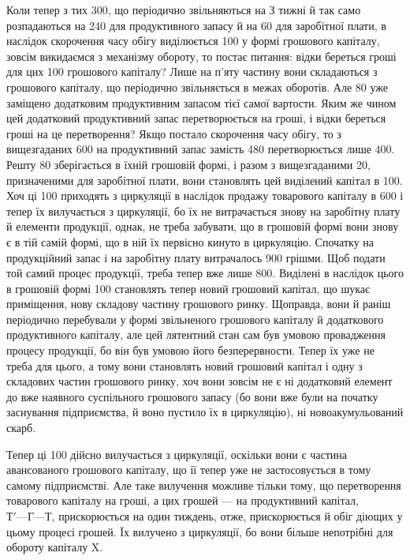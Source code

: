 Коли тепер з тих 300, що періодично звільняються на З
тижні й так само розпадаються на 240 для продуктивного запасу
й на 60 для заробітної плати, в наслідок скорочення часу
обігу виділюється 100 у формі грошового капіталу, зовсім викидаємся
з механізму обороту, то постає питання: відки береться гроші
для цих 100 грошового капіталу? Лише на п’яту частину вони
складаються з грошового капіталу, що періодично звільняється в межах
оборотів. Але  \deq{} 80 уже заміщено додатковим продуктивним
запасом тієї самої вартости. Яким же чином цей додатковий продуктивний
запас перетворюється на гроші, і відки береться гроші на це перетворення?
Якщо постало скорочення часу обігу, то з вищезгаданих 600
на продуктивний запас замість 480 перетворюється лише 400. Решту 80 зберігається в їхній грошовій формі, і
разом з вищезгаданими 20, призначеними для заробітної плати,
вони становлять цей виділений капітал в 100. Хоч ці 100 приходять з циркуляції в наслідок продажу товарового капіталу в
600 і тепер їх вилучається з циркуляції, бо їх не витрачається
знову на заробітну плату й елементи продукції, однак, не треба забувати,
що в грошовій формі вони знову є в тій самій формі, що в ній їх
первісно кинуто в циркуляцію. Спочатку на продукційний запас і на заробітну
плату витрачалось 900 грішми. Щоб подати той
самий процес продукції, треба тепер вже лише 800. Виділені в
наслідок цього в грошовій формі 100 становлять тепер новий
грошовий капітал, що шукає приміщення, нову складову частину грошового
ринку. Щоправда, вони й раніш періодично перебували у формі
звільненого грошового капіталу й додаткового продуктивного капіталу,
але цей лятентний стан сам був умовою провадження процесу продукції,
бо він був умовою його безперервности. Тепер їх уже не треба для
цього, а тому вони становлять новий грошовий капітал і одну з складових
частин грошового ринку, хоч вони зовсім не є ні додатковий елемент
до вже наявного суспільного грошового запасу (бо вони вже були
на початку заснування підприємства, й воно пустило їх в циркуляцію),
ні новоакумульований скарб.

Тепер ці 100 дійсно вилучається з циркуляції, оскільки вони
є частина авансованого грошового капіталу, що її тепер уже не застосовується
в тому самому підприємстві. Але таке вилучення можливе
тільки тому, що перетворення товарового капіталу на гроші, а цих грошей
— на продуктивний капітал, $Т' — Г — Т$, прискорюється на один тиждень,
отже, прискорюється й обіг діющих у цьому процесі грошей. Їх вилучено
з циркуляції, бо вони більше непотрібні для обороту капіталу X.

